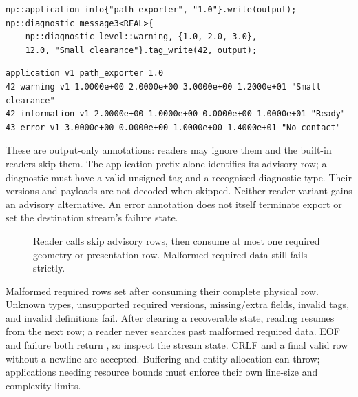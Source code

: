 \begin{lstlisting}
np::application_info{"path_exporter", "1.0"}.write(output);
np::diagnostic_message3<REAL>{
    np::diagnostic_level::warning, {1.0, 2.0, 3.0},
    12.0, "Small clearance"}.tag_write(42, output);
\end{lstlisting}
\begin{lstlisting}[style=plain]
application v1 path_exporter 1.0
42 warning v1 1.0000e+00 2.0000e+00 3.0000e+00 1.2000e+01 "Small clearance"
42 information v1 2.0000e+00 1.0000e+00 0.0000e+00 1.0000e+01 "Ready"
43 error v1 3.0000e+00 0.0000e+00 1.0000e+00 1.4000e+01 "No contact"
\end{lstlisting}
These are output-only annotations: readers may ignore them and the built-in
readers skip them. The application prefix alone identifies its advisory row;
a diagnostic must have a valid unsigned tag and a recognised diagnostic type.
Their versions and payloads are not decoded when skipped. Neither reader
variant gains an advisory alternative. An error annotation does not itself
terminate export or set the destination stream's failure state.

\begin{figure}[htbp]\centering
{}
\caption{Reader calls skip advisory rows, then consume at most one required
geometry or presentation row. Malformed required data still fails strictly.}
\label{fig:tagged-reader}
\end{figure}

Malformed required rows set  after consuming their complete
physical row. Unknown types, unsupported required versions, missing/extra
fields, invalid tags, and invalid definitions fail. After clearing a
recoverable state, reading resumes from the next row; a reader never searches
past malformed required data. EOF and failure both return , so
inspect the stream state. CRLF and a final valid row without a newline are
accepted. Buffering and entity allocation can throw; applications needing
resource bounds must enforce their own line-size and complexity limits.

